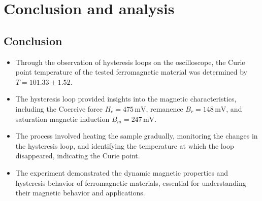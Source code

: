 \documentclass[UTF8]{article}
\begin{document}
\section{Conclusion and analysis}
\subsection{Conclusion}
\begin{itemize}
    \item Through the observation of hysteresis loops on the oscilloscope, the Curie point temperature of the tested ferromagnetic material was determined by \(T = 101.33 \pm 1.52\).
    \item The hysteresis loop provided insights into the magnetic characteristics, including the Coercive force \(H_c = 475 \, \text{mV}\), remanence \(B_r = 148 \, \text{mV}\), and saturation magnetic induction \(B_m = 247 \, \text{mV}\).
    \item The process involved heating the sample gradually, monitoring the changes in the hysteresis loop, and identifying the temperature at which the loop disappeared, indicating the Curie point.
    \item The experiment demonstrated the dynamic magnetic properties and hysteresis behavior of ferromagnetic materials, essential for understanding their magnetic behavior and applications.
\end{itemize}
\end{document}
